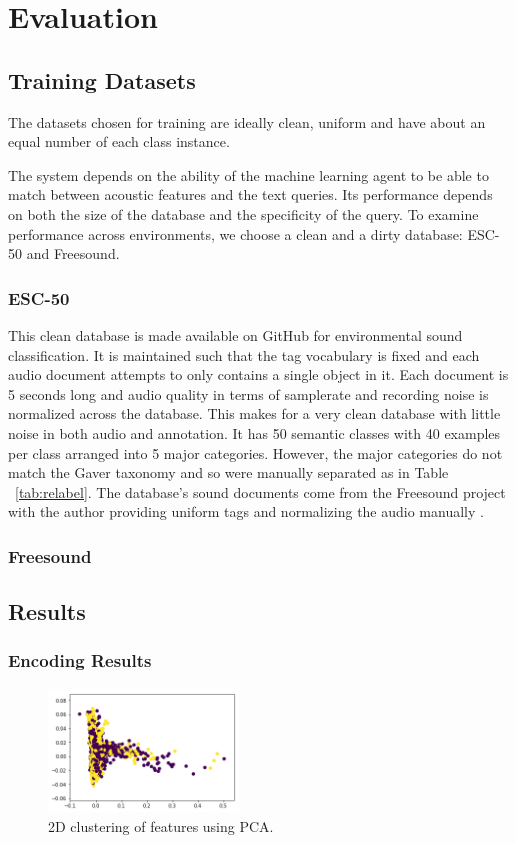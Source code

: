 \section{Evaluation}

\subsection{Training Datasets}
The datasets chosen for training are ideally clean, uniform and have about an equal number of each class instance. 

The system depends on the ability of the machine learning agent to be able to
match between acoustic features and the text queries. Its performance depends on
both the size of the database and the specificity of the query. To examine
performance across environments, we choose a clean and a dirty database: ESC-50
\cite{Piczak2015} and Freesound.

\subsubsection{ESC-50}
This clean database is made available on GitHub for environmental sound
classification. It is maintained such that the tag vocabulary is fixed and each
audio document attempts to only contains a single object in it. Each document is
5 seconds long and audio quality in terms of samplerate and recording noise is
normalized across the database. This makes for a very clean database with little
noise in both audio and annotation. It has 50 semantic classes with 40 examples
per class arranged into 5 major categories. However, the major categories do not
match the Gaver taxonomy and so were manually separated as in Table
~\ref{tab:relabel}. The database's sound documents come from the Freesound
project with the author providing uniform tags and normalizing the audio
manually \cite{Font2013}.

\subsubsection{Freesound}

\subsection{Results}

\subsubsection{Encoding Results}
\begin{figure}[h]
    \centering
    \includegraphics[width=0.45\textwidth]{figures/pca-cluster-hl.png}
    \caption{2D clustering of features using PCA.}
    \label{fig:pcahl}
\end{figure}

